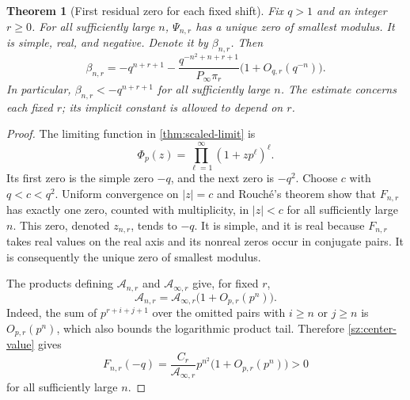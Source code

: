 \documentclass[11pt]{article}
\numberwithin{equation}{section}
\newtheorem{theorem}{Theorem}[section]
\theoremstyle{definition}
\theoremstyle{remark}
\begin{document}
\begin{theorem}[First residual zero for each fixed shift]
\label{sz:first-zero}
Fix $q>1$ and an integer $r\ge0$.  For all sufficiently large $n$,
$\Psi_{n,r}$ has a unique zero of smallest modulus.  It is simple,
real, and negative.  Denote it by $\beta_{n,r}$.  Then
\begin{equation}\label{sz:first-zero-asymptotic}
 \boxed{
 \beta_{n,r}
 =-q^{n+r+1}
 -\frac{q^{-n^2+n+r+1}}{P_\infty\pi_r}
 \bigl(1+O_{q,r}(q^{-n})\bigr).}
\end{equation}
In particular, $\beta_{n,r}<-q^{n+r+1}$ for all sufficiently large
$n$.  The estimate concerns each fixed $r$; its implicit constant is
allowed to depend on $r$.
\end{theorem}

\begin{proof}
The limiting function in \cref{thm:scaled-limit} is
\[
 \Phi_p(z)=\prod_{\ell=1}^{\infty}(1+zp^\ell)^\ell.
\]
Its first zero is the simple zero $-q$, and the next zero is $-q^2$.
Choose $c$ with $q<c<q^2$.  Uniform convergence on $|z|=c$ and
Rouch\'e's theorem show that $F_{n,r}$ has exactly one zero, counted
with multiplicity, in $|z|<c$ for all sufficiently large $n$.
This zero, denoted $z_{n,r}$, tends to $-q$.  It is simple, and it is
real because $F_{n,r}$ takes real values on the real axis and its
nonreal zeros occur in conjugate pairs.  It is consequently the
unique zero of smallest modulus.

The products defining $\mathcal A_{n,r}$ and $\mathcal A_{\infty,r}$
give, for fixed $r$,
\begin{equation}\label{sz:A-tail}
 \mathcal A_{n,r}=\mathcal A_{\infty,r}
 \bigl(1+O_{p,r}(p^n)\bigr).
\end{equation}
Indeed, the sum of $p^{r+i+j+1}$ over the omitted pairs with
$i\ge n$ or $j\ge n$ is $O_{p,r}(p^n)$, which also bounds the
logarithmic product tail.  Therefore \cref{sz:center-value} gives
\begin{equation}\label{sz:F-center}
 F_{n,r}(-q)=\frac{C_r}{\mathcal A_{\infty,r}}
 p^{n^2}\bigl(1+O_{p,r}(p^n)\bigr)>0
\end{equation}
for all sufficiently large $n$.


\end{proof}
\end{document}
